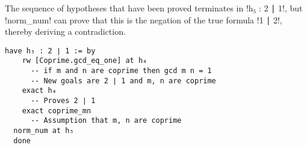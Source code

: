 The sequence of hypotheses that have been proved terminates in !h₅ : 2 ∣ 1!, but !norm_num! can prove that this is the negation of the true formula   !1 ∣ 2!, thereby deriving a contradiction.

\begin{Verbatim}[firstnumber=last]
  have h₅ : 2 ∣ 1 := by
    rw [Coprime.gcd_eq_one] at h₄
      -- if m and n are coprime then gcd m n = 1
      -- New goals are 2 ∣ 1 and m, n are coprime
    exact h₄
      -- Proves 2 ∣ 1
    exact coprime_mn
      -- Assumption that m, n are coprime
  norm_num at h₅
  done
\end{Verbatim}

